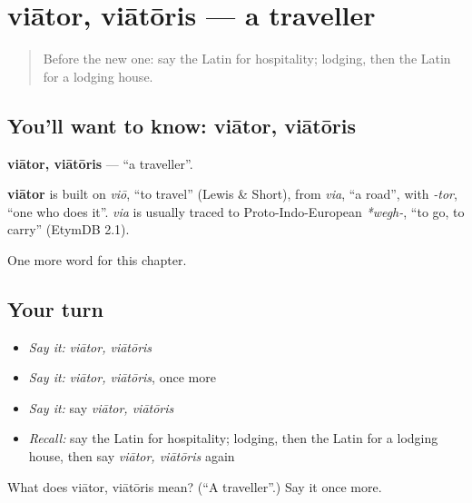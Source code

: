 \section[viātor, viātōris]{viātor, viātōris — a traveller}

\label{lesson:LA-C227-viator}



\begin{quote}
Before the new one: say the Latin for hospitality; lodging, then the Latin for a lodging house.
\end{quote}

\subsection*{You'll want to know: viātor, viātōris}
\textbf{viātor, viātōris} — \textquotedblleft{}a traveller\textquotedblright{}.

\begin{cousinweb}
\textbf{viātor} is built on \emph{viō}, \textquotedblleft{}to travel\textquotedblright{} (Lewis \& Short), from \emph{via}, \textquotedblleft{}a road\textquotedblright{}, with \emph{-tor}, \textquotedblleft{}one who does it\textquotedblright{}. \emph{via} is usually traced to Proto-Indo-European \emph{*wegh-}, \textquotedblleft{}to go, to carry\textquotedblright{} (EtymDB 2.1).
\end{cousinweb}

\begin{grammarlens}[title={What you've built}]
One more word for this chapter.
\end{grammarlens}

\subsection*{Your turn}
\begin{itemize}
\raggedright
  \item \emph{Say it:} \emph{viātor, viātōris}
  \item \emph{Say it:} \emph{viātor, viātōris}, once more
  \item \emph{Say it:} say \emph{viātor, viātōris}
  \item \emph{Recall:} say the Latin for hospitality; lodging, then the Latin for a lodging house, then say \emph{viātor, viātōris} again
\end{itemize}

\begin{tcolorbox}[breakable,colback=teal!4,colframe=teal!35!black,title={Before you move on}]
What does viātor, viātōris mean? (\textquotedblleft{}A traveller\textquotedblright{}.) Say it once more.
\end{tcolorbox}
